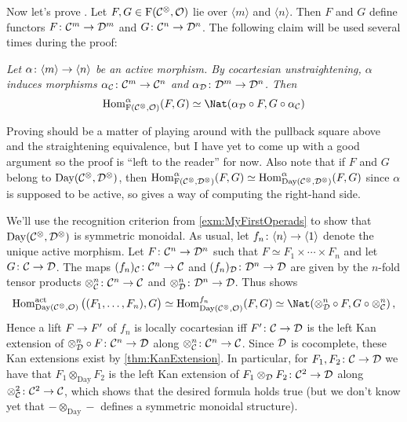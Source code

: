 \begin{proof*}
	Now let's prove . Let $F,G\in \operatorname{F}(\mathcal{C}^\otimes,\mathcal{O})$ lie over $\langle m\rangle$ and $\langle n\rangle$. Then $F$ and $G$ define functors $F\colon \Cc^m\morphism\Dd^m$ and $G\colon \Cc^n\morphism\Dd^n$. The following claim will be used several times during the proof:
	\begin{alphanumerate}
		\item[\itememph{\boxtimes}] \itshape Let $\alpha\colon \langle m\rangle\morphism\langle n\rangle$ be an active morphism. By cocartesian unstraightening, $\alpha$ induces morphisms $\alpha_\Cc\colon \Cc^m\morphism\Cc^n$ and $\alpha_\Dd\colon \Dd^m\morphism\Dd^n$. Then
		\begin{equation*}
			\Hom_{\F(\Cc^\otimes,\Oo)}^\alpha(F,G)\simeq \Nat(\alpha_\Dd\circ F,G\circ \alpha_\Cc)
		\end{equation*}
	\end{alphanumerate}
	Proving \itememph{\boxtimes} should be a matter of playing around with the pullback square above and the straightening equivalence, but I have yet to come up with a good argument so the proof is \enquote{left to the reader} for now. Also note that if $F$ and $G$ belong to $\operatorname{Day}(\mathcal{C}^\otimes,\mathcal{D}^\otimes)$, then $\operatorname{Hom}_{\operatorname{F}(\mathcal{C}^\otimes,\mathcal{D}^\otimes)}^\alpha(F,G)\simeq\operatorname{Hom}_{\operatorname{Day}(\mathcal{C}^\otimes,\mathcal{D}^\otimes)}^\alpha(F,G)$ since $\alpha$ is supposed to be active, so \itememph{\boxtimes} gives a way of computing the right-hand side.
	
	We'll use the recognition criterion from \cref{exm:MyFirstOperads} to show that $\operatorname{Day}(\mathcal{C}^\otimes,\mathcal{D}^\otimes)$ is symmetric monoidal. As usual, let $f_n\colon \langle n\rangle \morphism\langle 1\rangle$ denote the unique active morphism. Let $F\colon \Cc^n\morphism\Dd^n$ such that $F\simeq F_1\times\dotsb\times F_n$ and let $G\colon \Cc\morphism \Dd$. The maps $(f_n)_\Cc\colon \Cc^n\morphism \Cc$ and $(f_n)_\Dd\colon \Dd^n\morphism \Dd$ are given by the $n$-fold tensor products $\otimes_\Cc^n\colon \Cc^n\morphism\Cc$ and $\otimes_\Dd^n\colon \Dd^n\morphism\Dd$. Thus \itememph{\boxtimes} shows
	\begin{equation*}
		\Hom_{\operatorname{Day}(\Cc^\otimes,\Oo)}^\mathrm{act}\big((F_1,\dotsc,F_n),G\big)\simeq \Hom_{\operatorname{Day}(\Cc^\otimes,\Oo)}^{f_n}(F,G)\simeq \Nat(\otimes_\Dd^n\circ F,G\circ \otimes_\Cc^n)\,,
	\end{equation*}
	Hence a lift $F\morphism F'$ of $f_n$ is locally cocartesian iff $F'\colon \Cc\morphism\Dd$ is the left Kan extension of $\otimes_\Dd^n\circ F\colon \Cc^n\morphism\Dd$ along $\otimes_\Cc^n\colon \Cc^n\morphism\Cc$. Since $\mathcal{D}$ is cocomplete, these Kan extensions exist by \cref{thm:KanExtension}. In particular, for $F_1,F_2\colon \Cc\morphism\Dd$ we have that $F_1\otimes_{\operatorname{Day}}F_2$ is the left Kan extension of $F_1\otimes_\Dd F_2\colon \Cc^2\morphism \Dd$ along $\otimes_\Cc^2\colon \Cc^2\morphism\Cc$, which shows that the desired formula holds true (but we don't know yet that $-\otimes_{\operatorname{Day}}-$ defines a symmetric monoidal structure).
	

\end{proof*}

